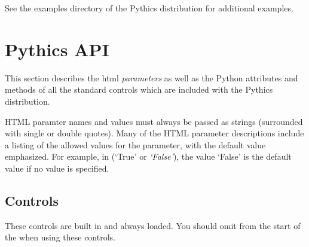 \documentclass[letterpaper,10pt,english]{sphinxmanual}
\begin{document}
See the examples directory of the Pythics distribution for additional examples.


\chapter{Pythics API}
\label{api:pythics-api}\label{api:api}\label{api::doc}
This section describes the html \emph{parameters} as well as the Python attributes
and methods of all the standard controls which are included with the Pythics
distribution.

HTML paramter names and values must always be passed as strings (surrounded
with single or double quotes). Many of the HTML parameter descriptions include
a listing of the allowed values for the parameter, with the default value
emphasized. For example, in (`True' or \emph{`False'}), the value `False' is the
default value if no value is specified.


\section{Controls}
\label{api:controls}
These controls are built in and always loaded. You should omit 
from the start of the  when using these controls.
\label{api:module-controls}
\end{document}
